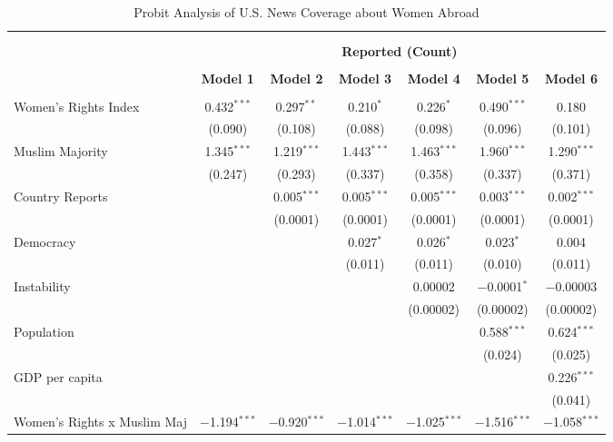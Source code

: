 
\begin{table}[!htbp] \centering 
  \caption{Probit Analysis of U.S. News Coverage about Women Abroad} 
  \label{table:negbin-part} 
\begin{tabular}{@{\extracolsep{5pt}}lcccccc} 
\\[-1.8ex]\hline \\[-1.8ex] 
\\[-1.8ex] & \multicolumn{6}{c}{\textbf{Reported (Count)}} \\ 
\\[-1.8ex] & \textbf{Model 1} & \textbf{Model 2} & \textbf{Model 3} & \textbf{Model 4} & \textbf{Model 5} & \textbf{Model 6}\\ 
\hline \\[-1.8ex] 
 Women's Rights Index & 0.432$^{***}$ & 0.297$^{**}$ & 0.210$^{*}$ & 0.226$^{*}$ & 0.490$^{***}$ & 0.180 \\ 
  & (0.090) & (0.108) & (0.088) & (0.098) & (0.096) & (0.101) \\ 
  Muslim Majority & 1.345$^{***}$ & 1.219$^{***}$ & 1.443$^{***}$ & 1.463$^{***}$ & 1.960$^{***}$ & 1.290$^{***}$ \\ 
  & (0.247) & (0.293) & (0.337) & (0.358) & (0.337) & (0.371) \\ 
  Country Reports &  & 0.005$^{***}$ & 0.005$^{***}$ & 0.005$^{***}$ & 0.003$^{***}$ & 0.002$^{***}$ \\ 
  &  & (0.0001) & (0.0001) & (0.0001) & (0.0001) & (0.0001) \\ 
  Democracy &  &  & 0.027$^{*}$ & 0.026$^{*}$ & 0.023$^{*}$ & 0.004 \\ 
  &  &  & (0.011) & (0.011) & (0.010) & (0.011) \\ 
  Instability &  &  &  & 0.00002 & $-$0.0001$^{*}$ & $-$0.00003 \\ 
  &  &  &  & (0.00002) & (0.00002) & (0.00002) \\ 
  Population &  &  &  &  & 0.588$^{***}$ & 0.624$^{***}$ \\ 
  &  &  &  &  & (0.024) & (0.025) \\ 
  GDP per capita &  &  &  &  &  & 0.226$^{***}$ \\ 
  &  &  &  &  &  & (0.041) \\ 
  Women's Rights x Muslim Maj & $-$1.194$^{***}$ & $-$0.920$^{***}$ & $-$1.014$^{***}$ & $-$1.025$^{***}$ & $-$1.516$^{***}$ & $-$1.058$^{***}$ \\ 

\end{tabular}
\end{table}
